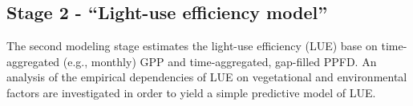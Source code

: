 \subsection{Stage 2 - ``Light-use efficiency model''}
\label{sec:ovstage2}
The second modeling stage estimates the light-use efficiency (LUE) base on time-aggregated (e.g., monthly) GPP and time-aggregated, gap-filled PPFD.  
An analysis of the empirical dependencies of LUE on vegetational and environmental factors are investigated in order to yield a simple predictive model of LUE.

